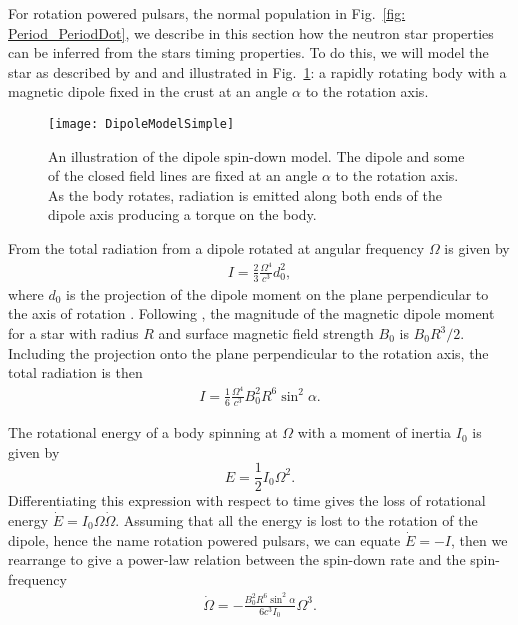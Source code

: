 For rotation powered pulsars, the normal population in Fig.~\ref{fig:
Period_PeriodDot}, we describe in this section how the neutron star properties
can be inferred from the stars timing properties. To do this, we will model the
star as described by \citet{Pacini1967} and \citet{Gold1968} and illustrated in
Fig.~\ref{fig: DipoleSpindownSimple}: a rapidly rotating
body with a magnetic dipole fixed in the crust at an angle $\alpha$ to the rotation
axis.
\begin{figure}[htb]
    \centering
    \texttt{[image: DipoleModelSimple]}
    \caption{An illustration of the dipole spin-down model. The dipole and some 
    of the closed field lines are fixed at an angle $\alpha$ to the rotation 
    axis. As the body rotates, radiation is emitted along both ends of the dipole
    axis producing a torque on the body.}
    \label{fig: DipoleSpindownSimple}
\end{figure}

From \citet{Landau2013classical} the total radiation from a dipole rotated at
angular frequency $\Omega$ is given by
\begin{align}
I = \frac{2}{3}\frac{\Omega^{4}}{c^{3}} d_{0}^{2},
\end{align}
where $d_0$ is the projection of the dipole moment on the plane perpendicular
to the axis of rotation \citep{Pacini1967}. Following \citet{Shapiro83}, the
magnitude of the magnetic dipole moment for a star with radius $R$ and surface magnetic
field strength $B_0$ is $B_{0}R^{3}/2$. Including the projection onto the
plane perpendicular to the rotation axis, the total radiation is then
\begin{align}
I = \frac{1}{6}\frac{\Omega^{4}}{c^{3}} B_0^2 R^{6} \sin^{2}\alpha.
\end{align}

The rotational energy of a body spinning at $\Omega$ with a moment of inertia
$I_{0}$ is given by
\begin{equation}
    E = \frac{1}{2}I_{0}\Omega^{2}.
\end{equation}
Differentiating this expression with respect to time gives the loss of rotational
energy $\dot{E}=I_0 \Omega\dot{\Omega}$. Assuming that all the energy is lost
to the rotation of the dipole, hence the name rotation powered pulsars, we can
equate $\dot{E} = -I$, then we rearrange
to give a power-law relation between the spin-down rate and the spin-frequency
\begin{align}
\dot{\Omega} = -\frac{B_0^{2} R^{6} \sin^{2}\alpha}{6 c^{3} I_0} \Omega^{3}.
\end{align}

